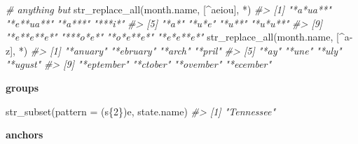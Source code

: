 \documentclass[
]{book}
\newenvironment{Shaded}{\begin{snugshade}}{\end{snugshade}}
\newcommand{\AttributeTok}[1]{\textcolor[rgb]{0.77,0.63,0.00}{#1}}
\newcommand{\CommentTok}[1]{\textcolor[rgb]{0.56,0.35,0.01}{\textit{#1}}}
\newcommand{\FunctionTok}[1]{\textcolor[rgb]{0.00,0.00,0.00}{#1}}
\newcommand{\NormalTok}[1]{#1}
\newcommand{\StringTok}[1]{\textcolor[rgb]{0.31,0.60,0.02}{#1}}
\begin{document}
\begin{Shaded}
\begin{Highlighting}[]
\CommentTok{\# anything but}
\FunctionTok{str\_replace\_all}\NormalTok{(month.name, }\StringTok{\textquotesingle{}[\^{}aeiou]\textquotesingle{}}\NormalTok{, }\StringTok{\textquotesingle{}*\textquotesingle{}}\NormalTok{)}
\CommentTok{\#\textgreater{}  [1] "*a*ua**"   "*e**ua**"  "*a***"     "***i*"    }
\CommentTok{\#\textgreater{}  [5] "*a*"       "*u*e"      "*u**"      "*u*u**"   }
\CommentTok{\#\textgreater{}  [9] "*e**e**e*" "***o*e*"   "*o*e**e*"  "*e*e**e*"}
\FunctionTok{str\_replace\_all}\NormalTok{(month.name, }\StringTok{\textquotesingle{}[\^{}a{-}z]\textquotesingle{}}\NormalTok{, }\StringTok{\textquotesingle{}*\textquotesingle{}}\NormalTok{)}
\CommentTok{\#\textgreater{}  [1] "*anuary"   "*ebruary"  "*arch"     "*pril"    }
\CommentTok{\#\textgreater{}  [5] "*ay"       "*une"      "*uly"      "*ugust"   }
\CommentTok{\#\textgreater{}  [9] "*eptember" "*ctober"   "*ovember"  "*ecember"}
\end{Highlighting}
\end{Shaded}

\textbf{groups}

\begin{Shaded}
\begin{Highlighting}[]
\FunctionTok{str\_subset}\NormalTok{(}\AttributeTok{pattern =} \StringTok{\textquotesingle{}(s\{2\})e\textquotesingle{}}\NormalTok{, state.name)}
\CommentTok{\#\textgreater{} [1] "Tennessee"}
\end{Highlighting}
\end{Shaded}

\textbf{anchors}

\begin{Shaded}
\end{Shaded}
\end{document}
